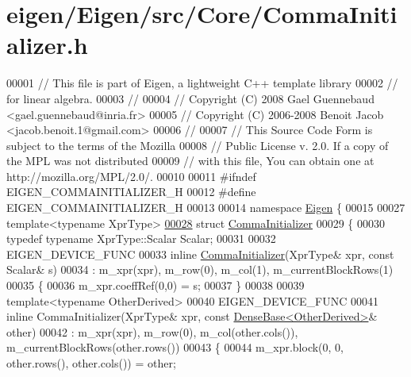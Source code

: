 \hypertarget{eigen_2_eigen_2src_2_core_2_comma_initializer_8h_source}{}\section{eigen/\+Eigen/src/\+Core/\+Comma\+Initializer.h}
\label{eigen_2_eigen_2src_2_core_2_comma_initializer_8h_source}

\begin{DoxyCode}
00001 \textcolor{comment}{// This file is part of Eigen, a lightweight C++ template library}
00002 \textcolor{comment}{// for linear algebra.}
00003 \textcolor{comment}{//}
00004 \textcolor{comment}{// Copyright (C) 2008 Gael Guennebaud <gael.guennebaud@inria.fr>}
00005 \textcolor{comment}{// Copyright (C) 2006-2008 Benoit Jacob <jacob.benoit.1@gmail.com>}
00006 \textcolor{comment}{//}
00007 \textcolor{comment}{// This Source Code Form is subject to the terms of the Mozilla}
00008 \textcolor{comment}{// Public License v. 2.0. If a copy of the MPL was not distributed}
00009 \textcolor{comment}{// with this file, You can obtain one at http://mozilla.org/MPL/2.0/.}
00010 
00011 \textcolor{preprocessor}{#ifndef EIGEN\_COMMAINITIALIZER\_H}
00012 \textcolor{preprocessor}{#define EIGEN\_COMMAINITIALIZER\_H}
00013 
00014 \textcolor{keyword}{namespace }\hyperlink{namespace_eigen}{Eigen} \{ 
00015 
00027 \textcolor{keyword}{template}<\textcolor{keyword}{typename} XprType>
\hyperlink{group___core___module}{00028} \textcolor{keyword}{struct }\hyperlink{group___core___module_struct_eigen_1_1_comma_initializer}{CommaInitializer}
00029 \{
00030   \textcolor{keyword}{typedef} \textcolor{keyword}{typename} XprType::Scalar Scalar;
00031 
00032   EIGEN\_DEVICE\_FUNC
00033   \textcolor{keyword}{inline} \hyperlink{group___core___module_struct_eigen_1_1_comma_initializer}{CommaInitializer}(XprType& xpr, \textcolor{keyword}{const} Scalar& s)
00034     : m\_xpr(xpr), m\_row(0), m\_col(1), m\_currentBlockRows(1)
00035   \{
00036     m\_xpr.coeffRef(0,0) = s;
00037   \}
00038 
00039   \textcolor{keyword}{template}<\textcolor{keyword}{typename} OtherDerived>
00040   EIGEN\_DEVICE\_FUNC
00041   \textcolor{keyword}{inline} CommaInitializer(XprType& xpr, \textcolor{keyword}{const} \hyperlink{group___core___module_class_eigen_1_1_dense_base}{DenseBase<OtherDerived>}& other)
00042     : m\_xpr(xpr), m\_row(0), m\_col(other.cols()), m\_currentBlockRows(other.rows())
00043   \{
00044     m\_xpr.block(0, 0, other.rows(), other.cols()) = other;

\end{DoxyCode}
